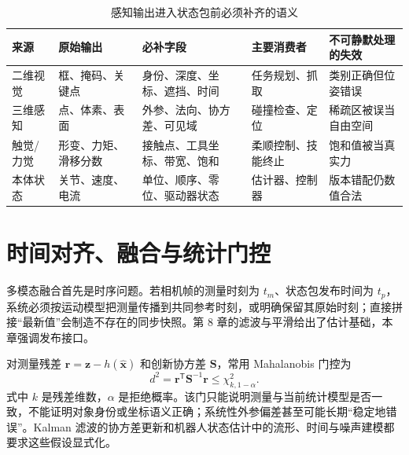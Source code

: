 \begin{table}[H]
\centering
\caption{感知输出进入状态包前必须补齐的语义}
\label{tab:perception-state-fields}
\begin{tabularx}{\textwidth}{p{}YYYY}
\toprule
来源 & 原始输出 & 必补字段 & 主要消费者 & 不可静默处理的失效 \\
\midrule
二维视觉 & 框、掩码、关键点 & 身份、深度、坐标、遮挡、时间 & 任务规划、抓取 & 类别正确但位姿错误 \\
三维感知 & 点、体素、表面 & 外参、法向、协方差、可见域 & 碰撞检查、定位 & 稀疏区被误当自由空间 \\
触觉/力觉 & 形变、力矩、滑移分数 & 接触点、工具坐标、带宽、饱和 & 柔顺控制、技能终止 & 饱和值被当真实力 \\
本体状态 & 关节、速度、电流 & 单位、顺序、零位、驱动器状态 & 估计器、控制器 & 版本错配仍数值合法 \\
\bottomrule
\end{tabularx}
\end{table}

\section{时间对齐、融合与统计门控}

多模态融合首先是时序问题。若相机帧的测量时刻为 $t_m$、状态包发布时间为 $t_p$，系统必须按运动模型把测量传播到共同参考时刻，或明确保留其原始时刻；直接拼接“最新值”会制造不存在的同步快照。第 8 章的滤波与平滑给出了估计基础，本章强调发布接口。

对测量残差 $\bm{r}=\bm{z}-h(\hat{\bm{x}})$ 和创新协方差 $\bm{S}$，常用 Mahalanobis 门控为
\begin{equation}
d^2=\bm{r}^{\mathsf T}\bm{S}^{-1}\bm{r}\leq \chi^2_{k,1-\alpha}.
\label{eq:mahalanobis-gate}
\end{equation}
式中 $k$ 是残差维数，$\alpha$ 是拒绝概率。该门只能说明测量与当前统计模型是否一致，不能证明对象身份或坐标语义正确；系统性外参偏差甚至可能长期“稳定地错误”。Kalman 滤波的协方差更新\cite{kalman1960new}和机器人状态估计中的流形、时间与噪声建模\cite{barfoot2024state}都要求这些假设显式化。

